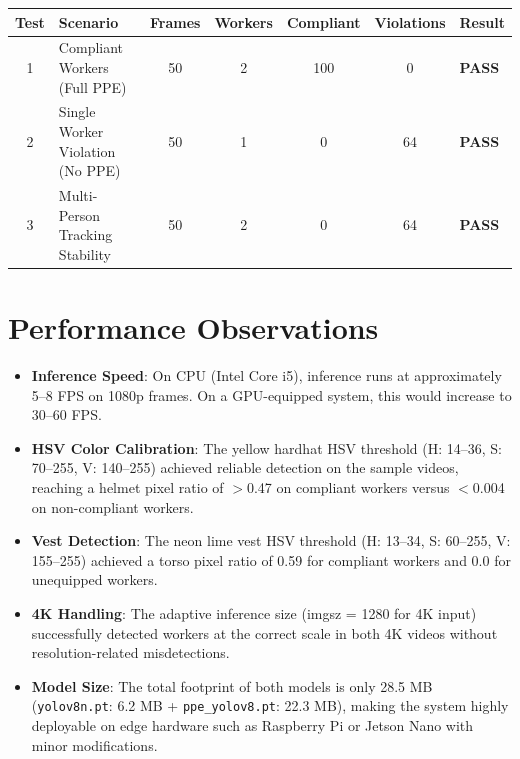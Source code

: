 \documentclass[12pt,a4paper]{report}
\begin{document}
\begin{center}
\renewcommand{\arraystretch}{1.4}
\begin{tabular}{|c|p{3.5cm}|c|c|c|c|p{2.5cm}|}
\hline
\textbf{Test} & \textbf{Scenario} & \textbf{Frames} & \textbf{Workers} & \textbf{Compliant} & \textbf{Violations} & \textbf{Result} \\
\hline
1 & Compliant Workers (Full PPE) & 50 & 2 & 100 & 0 & \textcolor{green!60!black}{\textbf{PASS}} \\
\hline
2 & Single Worker Violation (No PPE) & 50 & 1 & 0 & 64 & \textcolor{green!60!black}{\textbf{PASS}} \\
\hline
3 & Multi-Person Tracking Stability & 50 & 2 & 0 & 64 & \textcolor{green!60!black}{\textbf{PASS}} \\
\hline
\end{tabular}
\end{center}

\section{Performance Observations}

\begin{itemize}
    \item \textbf{Inference Speed}: On CPU (Intel Core i5), inference runs at approximately 5--8 FPS on 1080p frames. On a GPU-equipped system, this would increase to 30--60 FPS.
    \item \textbf{HSV Color Calibration}: The yellow hardhat HSV threshold (H: 14--36, S: 70--255, V: 140--255) achieved reliable detection on the sample videos, reaching a helmet pixel ratio of $>$0.47 on compliant workers versus $<$0.004 on non-compliant workers.
    \item \textbf{Vest Detection}: The neon lime vest HSV threshold (H: 13--34, S: 60--255, V: 155--255) achieved a torso pixel ratio of 0.59 for compliant workers and 0.0 for unequipped workers.
    \item \textbf{4K Handling}: The adaptive inference size (imgsz = 1280 for 4K input) successfully detected workers at the correct scale in both 4K videos without resolution-related misdetections.
    \item \textbf{Model Size}: The total footprint of both models is only 28.5 MB (\texttt{yolov8n.pt}: 6.2 MB + \texttt{ppe\_yolov8.pt}: 22.3 MB), making the system highly deployable on edge hardware such as Raspberry Pi or Jetson Nano with minor modifications.
\end{itemize}
\end{document}
